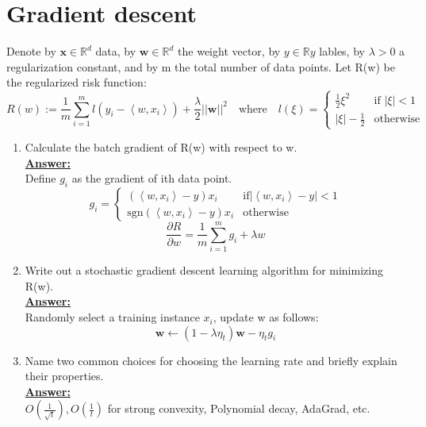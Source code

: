 \documentclass{article}
\renewcommand{\vec}[1]{\boldsymbol{#1}}
\newenvironment{qparts}{\begin{enumerate}[1.]}{\end{enumerate}}
\begin{document}
\newpage
\section{Gradient descent}
Denote by $\vec{x}\in\mathbb{R}^d$ data, by $\vec{w}\in\mathbb{R}^d$ the weight vector, by $y\in\mathbb{R}y$ lables, by $\lambda>0$ a regularization constant, and by m the total number of data points. Let R(w) be the regularized risk function:
\begin{equation}
R(w):=\frac{1}{m}\sum^m_{i=1}l(y_i-\left<w,x_i\right>)+\frac{\lambda}{2}||\vec{w}||^2 \quad\text{where}\quad l(\xi)=\begin{cases}
\frac{1}{2}\xi^2 &\text{if $|\xi|<1$} \\
|\xi|-\frac{1}{2} &\text{otherwise}
\end{cases}
\end{equation}
\begin{qparts}
\item Calculate the batch gradient of R(w) with respect to w.\\
\underline{\textbf{Answer:}}\\
Define $g_i$ as the gradient of ith data point.
\begin{equation}
g_i=\begin{cases}
(\left<w,x_i\right>-y)x_i &\text{if$|\left<w,x_i\right>-y|<1$} \\
\text{sgn}(\left<w,x_i\right>-y)x_i &\text{otherwise}
\end{cases}
\end{equation}
\begin{equation}
\frac{\partial R}{\partial w}=\frac{1}{m}\sum^m_{i=1}g_i+\lambda w
\end{equation}

\item Write out a stochastic gradient descent learning algorithm for minimizing R(w).\\
\underline{\textbf{Answer:}}\\
Randomly select a training instance $x_i$, update w as follows:
\begin{equation}
\vec{w}\leftarrow (1-\lambda\eta_t)\vec{w}-\eta_tg_i
\end{equation}

\item Name two common choices for choosing the learning rate and briefly explain their properties.\\
\underline{\textbf{Answer:}}\\
$O(\frac{1}{\sqrt{t}}), O(\frac{1}{t})$ for strong convexity, Polynomial decay, AdaGrad, etc.
\end{qparts}
\end{document}
